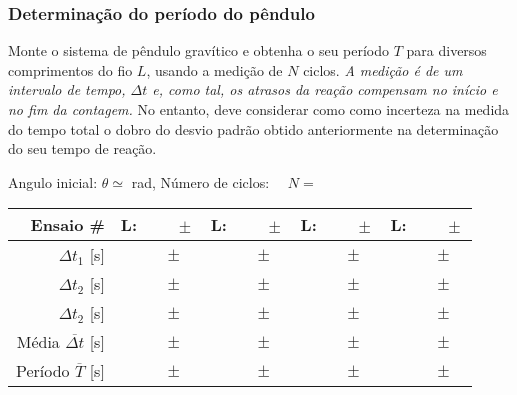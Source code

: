 \documentclass[a4paper,12pt]{article}      %
\begin{document}
\subsubsection*{\sf Determinação do período do pêndulo}
Monte o sistema de pêndulo gravítico e obtenha o seu período $T$ para diversos comprimentos do fio $L$, usando a medição de $N$ ciclos. 
\emph{A medição é de um intervalo de tempo, $\Delta t$ e, como tal, os atrasos da reação compensam no início e no fim da contagem.} No entanto, deve considerar como como incerteza na medida do tempo total o dobro do desvio padrão obtido anteriormente na determinação do seu tempo de reação.


\begin{center}
\begin{small}
	\noindent Angulo inicial:	$\theta \simeq$ \underline{\makebox[1.5cm][r]{~}} rad,  Número de ciclos: $\quad N=$\underline{\makebox[1cm][r]{~}} \\
\bigskip
\begin{tabular}{|r|c|c|c|c|}
\hline
Ensaio  \# & L: $\qquad \pm$ \qquad [mm] & L: $\qquad \pm$ \qquad[mm] & L: $\qquad \pm$ \qquad[mm] & L: $\qquad \pm$ \qquad[mm]\\
\hline \hline
$\Delta t_1$   [s]&  $\qquad \pm$ \quad &  $\qquad \pm$ \quad&  $\qquad \pm$ \quad&  $\qquad \pm$ \quad\\ \hline
$\Delta t_2$   [s]&  $\qquad \pm$ \quad &  $\qquad \pm$ \quad&  $\qquad \pm$ \quad&  $\qquad \pm$ \quad\\ \hline
$\Delta t_2$   [s]&  $\qquad \pm$ \quad &  $\qquad \pm$ \quad&  $\qquad \pm$ \quad&  $\qquad \pm$ \quad\\ \hline
\hline 
Média $\overline{\Delta t}$ [s] & $\qquad \pm$ \quad  & $\qquad \pm$ \quad  &  $\qquad \pm$ \quad  & $\qquad \pm$ \quad \\
Período $\overline{T}$ [s] & $\qquad \pm$ \quad  & $\qquad \pm$ \quad  &  $\qquad \pm$ \quad  &  $\qquad \pm$ \quad  \\
\hline

\end{tabular}
\end{small}
\end{center}
\end{document}
